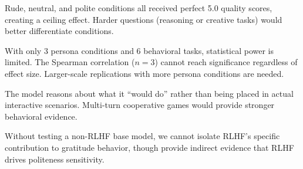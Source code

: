  Rude, neutral, and polite conditions all received perfect 5.0 quality scores, creating a ceiling effect. Harder questions (\eg reasoning or creative tasks) would better differentiate conditions.

 With only 3 persona conditions and 6 behavioral tasks, statistical power is limited. The Spearman correlation ($n = 3$) cannot reach significance regardless of effect size. Larger-scale replications with more persona conditions are needed.

 The model reasons about what it ``would do'' rather than being placed in actual interactive scenarios. Multi-turn cooperative games would provide stronger behavioral evidence.

 Without testing a non-RLHF base model, we cannot isolate RLHF's specific contribution to gratitude behavior, though \citet{yin2024politeness} provide indirect evidence that RLHF drives politeness sensitivity.